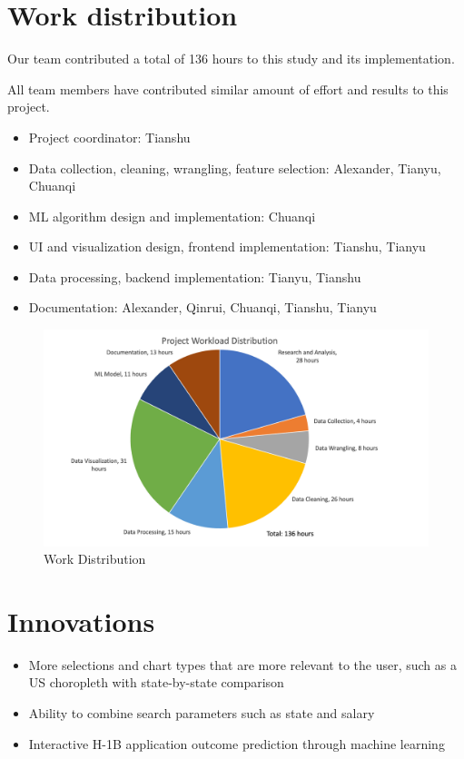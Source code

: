\documentclass[sigconf]{acmart}
\begin{document}
\appendix

\section{Work distribution}

Our team contributed a total of 136 hours to this study and its implementation. 




All team members have contributed similar amount of effort and results to this project.
 
\begin{itemize} 
	\item Project coordinator: Tianshu 
	\item Data collection, cleaning, wrangling, feature selection: Alexander, Tianyu, Chuanqi 
	\item ML algorithm design and implementation: Chuanqi 
	\item UI and visualization design, frontend implementation: Tianshu, Tianyu 
	\item Data processing, backend implementation: Tianyu, Tianshu
	\item Documentation: Alexander, Qinrui, Chuanqi, Tianshu, Tianyu 
	
\end{itemize}
\begin{figure}
  \includegraphics[width=\linewidth]{fig5_work_distribution.png}
  \caption{Work Distribution}
  \label{fig:workdistribution}
\end{figure}

\section{Innovations}
\begin{itemize}
	\item More selections and chart types that are more relevant to the user, such as a US choropleth with state-by-state comparison
	\item Ability to combine search parameters such as state and salary
	\item Interactive H-1B application outcome prediction through machine learning

\end{itemize}
\end{document}
